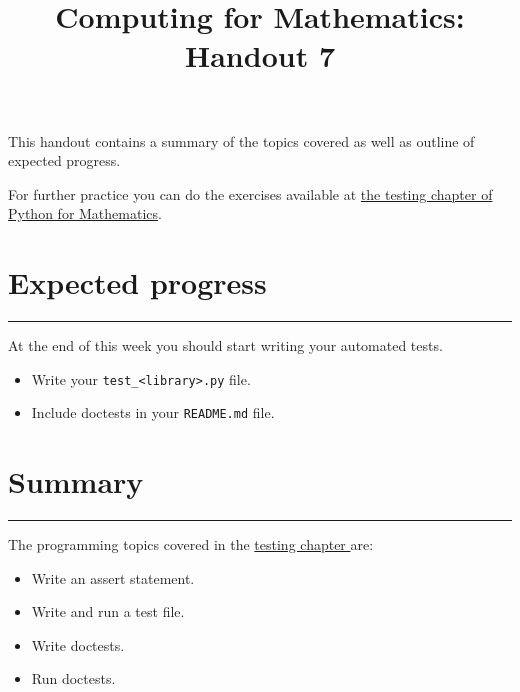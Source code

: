 \documentclass{article}
\title{Computing for Mathematics: Handout 7}
\date{}
\begin{document}
\maketitle


This handout contains a summary of the topics covered as well as outline of
expected progress.

For further practice you can do the exercises available at 
\href{https://vknight.org/pfm/building-tools/06-testing/exercises/main.html}{the
testing chapter of Python for Mathematics}.

\section{Expected progress}
\hrule

At the end of this week you should start writing your automated tests.

\begin{itemize}
    \item Write your \texttt{test_<library>.py} file.
    \item Include doctests in your \texttt{README.md} file.
\end{itemize}

\begin{center}
\end{center}

\section{Summary}\label{summary}
\hrule

The programming topics covered in the
\href{https://vknight.org/pfm/building-tools/06-testing/introduction/main.html}{testing
chapter
} are:


\begin{itemize}
\item Write an assert statement.
\item Write and run a test file.
\item Write doctests.
\item Run doctests.
\end{itemize}
\end{document}

